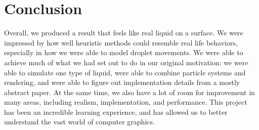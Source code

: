 \documentclass[10pt,twocolumn,letterpaper]{article}
\begin{document}
\section{Conclusion}

Overall, we produced a result that feels like real liquid on a surface. We were impressed by how well heuristic methods could resemble real life behaviors, especially in how we were able to model droplet movements. We were able to achieve much of what we had set out to do in our original motivation: we were able to simulate one type of liquid, were able to combine particle systems and rendering, and were able to figure out implementation details from a mostly abstract paper. At the same time, we also have a lot of room for improvement in many areas, including realism, implementation, and performance. This project has been an incredible learning experience, and has allowed us to better understand the vast world of computer graphics.

{\small


}
\end{document}
